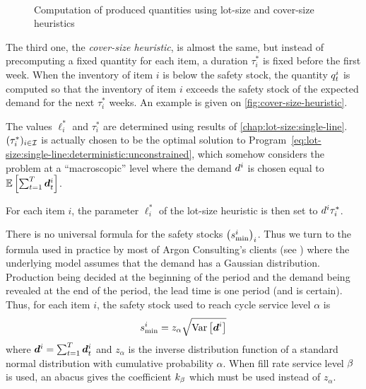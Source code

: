 \begin{figure}[h]
  \centering
  \\
  \caption{Computation of produced quantities using lot-size and cover-size heuristics}
  \label{fig:lot-and-cover-size-heuristics}
\end{figure}


The third one, the {\em cover-size heuristic}, is almost the same, but instead of precomputing a fixed quantity for each item, a duration $\tau_i^*$ is fixed before the first week.
When the inventory of item $i$ is below the safety stock, the quantity $q_t^i$ is computed so that the inventory of item $i$ exceeds the safety stock of the expected demand for the next $\tau_i^*$ weeks.
An example is given on \cref{fig:cover-size-heuristic}.


The values $\ell_i^*$ and $\tau_i^*$ are determined using results of \cref{chap:lot-size:single-line}.
$(\tau_i^*)_{i\in\mathcal{I}}$ is actually chosen to be the optimal solution to Program~\eqref{eq:lot-size:single-line:deterministic:unconstrained}, which somehow considers the problem at a ``macroscopic'' level
where the demand $d^i$ is chosen equal to $\espe\sqbracket{\sum_{t=1}^{\horizon}\va d_t^i}$.


For each item $i$, the parameter $\ell_i^*$ of the lot-size heuristic is then set to $d^i\tau_i^*$.


There is no universal formula for the safety stocks $\bracket{\safety^i}_i$.
Thus we turn to the formula used in practice by most of Argon Consulting's clients (see \citet[Chapter 11]{Arnold2007}) where the underlying model assumes that the demand has a Gaussian distribution.
Production being decided at the beginning of the period and the demand being revealed at the end of the period, the lead time is one period (and is certain).
Thus, for each item $i$, the safety stock used to reach cycle service level $\alpha$ is
\begin{equation}\label{eq:PDP:numerical-experiments:safety-stock}
  \safety^i = z_{\alpha} \sqrt{\vari\sqbracket{\va\demand^i}}
\end{equation}
where $\va\demand^i=\sum_{t=1}^{\horizon}\va\demand_t^i$ and $z_{\alpha}$ is the inverse distribution function of a standard normal distribution with cumulative probability $\alpha$.
When fill rate service level $\beta$ is used, an abacus gives the coefficient $k_{\beta}$ which must be used instead of $z_{\alpha}$.


